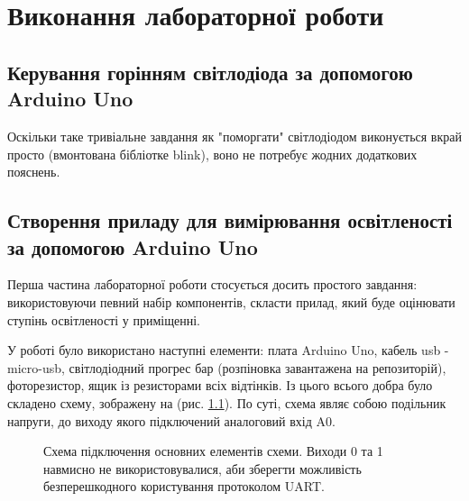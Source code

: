 \chapter{Виконання лабораторної роботи} 
\label{chapter:first}

\section{Керування горінням світлодіода за допомогою Arduino Uno}

Оскільки таке тривіальне завдання як "поморгати" світлодіодом виконується вкрай просто (вмонтована бібліотке blink), воно не потребує жодних додаткових пояснень.

\section{Створення приладу для вимірювання освітленості за допомогою Arduino Uno}

Перша частина лабораторної роботи стосується досить простого завдання: використовуючи певний набір компонентів, скласти прилад, який буде оцінювати ступінь освітленості у приміщенні.

У роботі було використано наступні елементи: плата Arduino Uno, кабель usb - micro-usb, світлодіодний прогрес бар (розпіновка завантажена на репозиторій), фоторезистор, ящик із резисторами всіх відтінків. Із цього всього добра було складено схему, зображену на (рис. \ref{fig:shema1}). По суті, схема являє собою подільник напруги, до виходу якого підключений аналоговий вхід A0.

\begin{figure}[h]
\caption{Схема підключення основних елементів схеми. Виходи 0 та 1 навмисно не використовувалися, аби зберегти можливість безперешкодного користування протоколом UART.}
\label{fig:shema1}
\end{figure}

